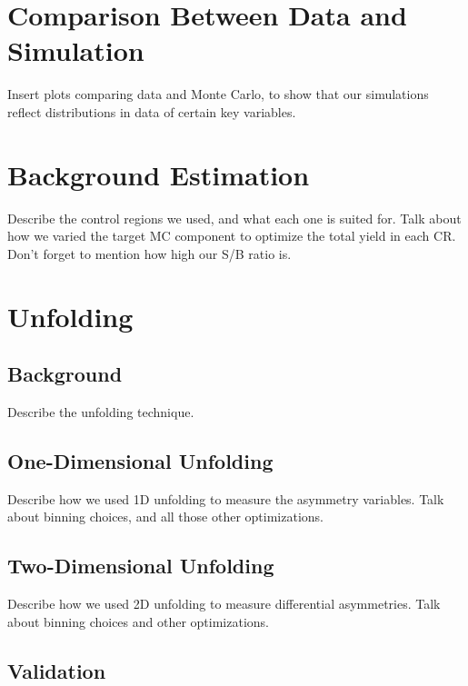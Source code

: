 \section{Comparison Between Data and Simulation}
\label{sec:afbdatamccompare}

Insert plots comparing data and Monte Carlo, to show that our
simulations reflect distributions in data of certain key variables.

\section{Background Estimation}
\label{sec:afbbackground}

Describe the control regions we used, and what each one is suited for.
Talk about how we varied the target MC component to optimize the total
yield in each CR.
Don't forget to mention how high our S/B ratio is.

\section{Unfolding}
\label{sec:afbunfolding}

\subsection{Background}
\label{ssec:afbunfoldingbkg}

Describe the unfolding technique.

\subsection{One-Dimensional Unfolding}
\label{ssec:afbunfolding1d}

Describe how we used 1D unfolding to measure the asymmetry variables.
Talk about binning choices, and all those other optimizations.

\subsection{Two-Dimensional Unfolding}
\label{ssec:afbunfolding2d}

Describe how we used 2D unfolding to measure differential asymmetries.
Talk about binning choices and other optimizations.

\subsection{Validation}
\label{ssec:afbunfoldingtests}

